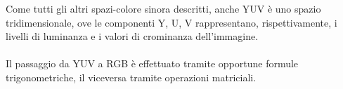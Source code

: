 \documentclass{subfiles}
\begin{document}
Come tutti gli altri spazi-colore sinora descritti, anche YUV è uno spazio tridimensionale, ove le componenti Y, U, V rappresentano,
rispettivamente, i livelli di luminanza e i valori di crominanza dell'immagine.
\\ \\
Il passaggio da YUV a RGB è effettuato tramite opportune formule trigonometriche, il viceversa tramite operazioni matriciali.
\end{document}
